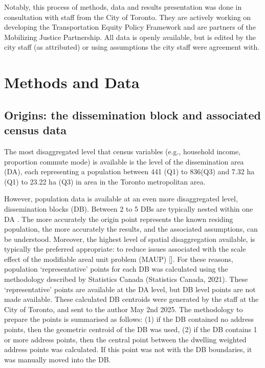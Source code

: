 \documentclass[
11pt, %
oneside, %
english, %
singlespacing, %
]{macthesis} %
\begin{document}
Notably, this process of methods, data and results presentation was done in consultation with staff from the City of Toronto. They are actively working on developing the Transportation Equity Policy Framework and are partners of the Mobilizing Justice Partnership. All data is openly available, but is edited by the city staff (as attributed) or using assumptions the city staff were agreement with.

\section{Methods and Data}\label{methods-and-data}

\subsection{Origins: the dissemination block and associated census data}\label{origins-the-dissemination-block-and-associated-census-data}

The most disaggregated level that census variables (e.g., household income, proportion commute mode) is available is the level of the dissemination area (DA), each representing a population between 441 (Q1) to 836(Q3) and 7.32 ha (Q1) to 23.22 ha (Q3) in area in the Toronto metropolitan area.

However, population data is available at an even more disaggregated level, dissemination blocks (DB). Between 2 to 5 DBs are typically nested within one DA . The more accurately the origin point represents the known residing population, the more accurately the results, and the associated assumptions, can be understood. Moreover, the highest level of spatial disaggregation available, is typically the preferred appropriate: to reduce issues associated with the scale effect of the modifiable areal unit problem (MAUP) {[}{]}. For these reasons, population `representative' points for each DB was calculated using the methodology described by Statistics Canada (Statistics Canada, 2021). These `representative' points are available at the DA level, but DB level points are not made available. These calculated DB centroids were generated by the staff at the City of Toronto, and sent to the author May 2nd 2025. The methodology to prepare the points is summarised as follows: (1) if the DB contained no address points, then the geometric centroid of the DB was used, (2) if the DB contains 1 or more address points, then the central point between the dwelling weighted address points was calculated. If this point was not with the DB boundaries, it was manually moved into the DB.
\end{document}
